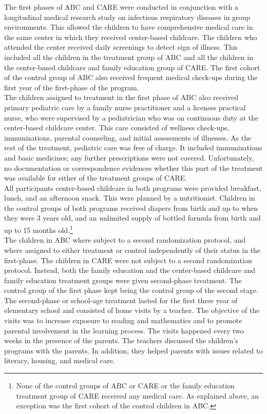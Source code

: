 \noindent The first phases of ABC and CARE were conducted in conjunction with a longitudinal medical research study on infectious respiratory diseases in group environments. This allowed the children to have comprehensive medical care in the same center in which they received center-based childcare. The children who attended the center received daily screenings to detect sign of illness. This included all the children in the treatment group of ABC and all the children in the center-based childcare and family education group of CARE. The first cohort of the control group of ABC also received frequent medical check-ups during the first year of the first-phase of the program.\\

\noindent The children assigned to treatment in the first phase of ABC also received primary pediatric care by a family nurse practitioner and a licenses practical nurse, who were supervised by a pediatrician who was on continuous duty at the center-based childcare center. This care consisted of wellness check-ups, immunizations, parental counseling, and initial assessments of illnesses. As the rest of the treatment, pediatric care was free of charge. It included immunizations and basic medicines; any further prescriptions were not covered. Unfortunately, no documentation or correspondence evidences whether this part of the treatment was available for either of the treatment groups of CARE.\\

\noindent All participants center-based childcare in both programs were provided breakfast, lunch, and an afternoon snack. This were planned by a nutritionist. Children in the control groups of both programs received diapers from birth and up to when they were 3 years old, and an unlimited supply of bottled formula from birth and up to 15 months old.\footnote{None of the control groups of  ABC or CARE or the family education treatment group of CARE received any medical care. As explained above, an exception was the first cohort of the control children in ABC.}\\

\noindent The children in ABC where subject to a second randomization protocol, and where assigned to either treatment or control independently of their status in the first-phase. The children in CARE were not subject to a second randomization protocol. Instead, both the family education and the center-based childcare and family education treatment groups were given second-phase treatment. The control group of the first phase kept being the control group of the second stage. The second-phase or school-age treatment lasted for the first three year of elementary school and consisted of home visits by a teacher. The objective of the visits was to increase exposure to reading and mathematics and to promote parental involvement in the learning process. The visits happened every two weeks in the presence of the parents. The teachers discussed the children's programs with the parents. In addition, they helped parents with issues related to literacy, housing, and medical care.\\ 

